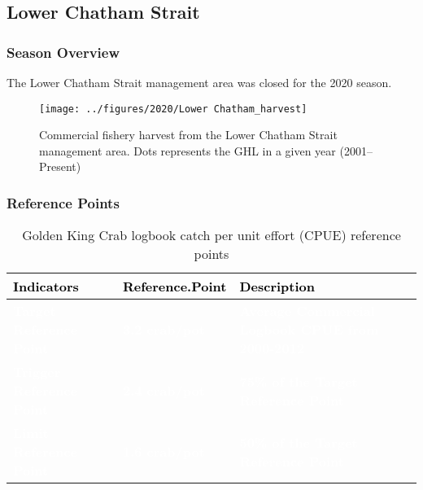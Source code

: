 \documentclass[]{article}
\begin{document}
\subsection{Lower Chatham Strait}\label{lower-chatham-strait}

\subsubsection{Season Overview}\label{season-overview-5}

The Lower Chatham Strait management area was closed for the 2020 season.

\begin{figure}[H]
\texttt{[image: ../figures/2020/Lower Chatham\_harvest]} \caption{Commercial fishery harvest from the Lower Chatham Strait management area. Dots represents the GHL in a given year (2001–Present)}\label{fig:unnamed-chunk-17}
\end{figure}

\subsubsection{Reference Points}\label{reference-points-6}

\begin{table}[!h]

\caption{\label{tab:unnamed-chunk-18}Golden King Crab logbook catch per unit effort (CPUE) reference points}
\centering
\begin{tabular}[t]{l|l|l}
\hline
\textcolor{black}{\textbf{Indicators}} & \textcolor{black}{\textbf{Reference.Point}} & \textcolor{black}{\textbf{Description}}\\
\hline
\rowcolor{gray!6}  \rowcolor{olive}  \textcolor{white}{\textbf{Target Reference Point}} & \textcolor{white}{\textbf{3.2 crab/pot}} & \textcolor{white}{\textbf{Average Commercial Logbook CPUE from 2000-2012}}\\
\hline
\rowcolor{orange}  \textcolor{white}{\textbf{Trigger Reference Point}} & \textcolor{white}{\textbf{2.4 crab/pot}} & \textcolor{white}{\textbf{75\% of the Target Reference Point}}\\
\hline
\rowcolor{gray!6}  \rowcolor{red}  \textcolor{white}{\textbf{Limit Reference Point}} & \textcolor{white}{\textbf{1.6 crab/pot}} & \textcolor{white}{\textbf{50\% of the Target Reference Point}}\\
\hline
\end{tabular}
\end{table}
\end{document}
